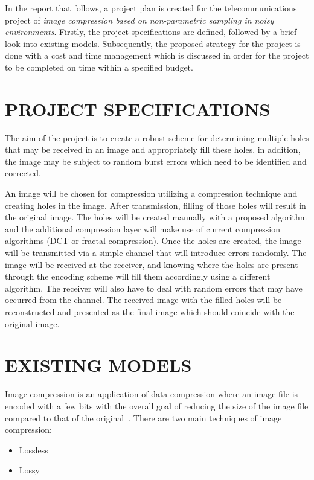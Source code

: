 \documentclass[10pt,twocolumn, a4paper]{witseiepaper}
\begin{document}
In the report that follows, a project plan is created for the telecommunications project of \emph{image compression based on non-parametric sampling in noisy environments}. Firstly, the project specifications are defined, followed by a brief look into existing models. Subsequently, the proposed strategy for the project is done with a cost and time management which is discussed in order for the project to be completed on time within a specified budget.

%
\section{PROJECT SPECIFICATIONS}
\label{sec: Project Specs}
The aim of the project is to create a robust scheme for determining multiple holes that may be received in an image and appropriately fill these holes. in addition, the image may be subject to random burst errors which need to be identified and corrected.

An image will be chosen for compression utilizing a compression technique and creating holes in the image. After transmission, filling of those holes will result in the original image. The holes will be created manually with a proposed algorithm and the additional compression layer will make use of current compression algorithms (DCT or fractal compression). Once the holes are created, the image will be transmitted via a simple channel that will introduce errors randomly. The image will be received at the receiver, and knowing where the holes are present through the encoding scheme will fill them accordingly using a different algorithm. The receiver will also have to deal with random errors that may have occurred from the channel. The received image with the filled holes will be reconstructed and presented as the final image which should coincide with the original image.

%
\section{EXISTING MODELS}
\label{sec: Existing Models}
Image compression is an application of data compression where an image file is encoded with a few bits with the overall goal of reducing the size of the image file compared to that of the original~\cite{ImageComp}. There are two main techniques of image compression:
\begin{itemize}
\item Lossless
\item Lossy
\end{itemize}
\end{document}
